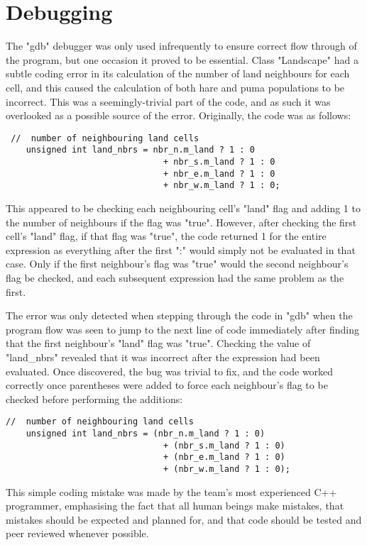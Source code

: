 \section{Debugging}
\label{Debugging}
The "gdb" debugger was only used infrequently to ensure correct flow through of the program, but one occasion it proved to be essential. Class "Landscape" had a subtle coding error in its calculation of the number of land neighbours for each cell, and this caused the calculation of both hare and puma populations to be incorrect. This was a seemingly-trivial part of the code, and as such it was overlooked as a possible source of the error.
Originally, the code was as follows:

\begin{lstlisting}
 //  number of neighbouring land cells
	unsigned int land_nbrs = nbr_n.m_land ? 1 : 0
		                       + nbr_s.m_land ? 1 : 0
		                       + nbr_e.m_land ? 1 : 0
		                       + nbr_w.m_land ? 1 : 0;
\end{lstlisting}

This appeared to be checking each neighbouring cell's "land" flag and adding 1 to the number of neighbours if the flag was "true".  However, after checking the first cell's "land" flag, if that flag was "true", the code returned 1 for the entire expression as everything after the first ":" would simply not be evaluated in that case.  Only if the first neighbour's flag was "true" would the second neighbour's flag be checked, and each subsequent expression had the same problem as the first.

The error was only detected when stepping through the code in "gdb" when the program flow was seen to jump to the next line of code immediately after finding that the first neighbour's "land" flag was "true".  Checking the value of "land\_nbrs" revealed that it was incorrect after the expression had been evaluated.  Once discovered, the bug was trivial to fix, and the code worked correctly once parentheses were added to force each neighbour's flag to be checked before performing the additions:

\begin{lstlisting}
//  number of neighbouring land cells
	unsigned int land_nbrs = (nbr_n.m_land ? 1 : 0)
		                       + (nbr_s.m_land ? 1 : 0)
		                       + (nbr_e.m_land ? 1 : 0)
		                       + (nbr_w.m_land ? 1 : 0);
\end{lstlisting}

This simple coding mistake was made by the team's most experienced C++ programmer, emphasising the fact that all human beings make mistakes, that mistakes should be expected and planned for, and that code should be tested and peer reviewed whenever possible.

